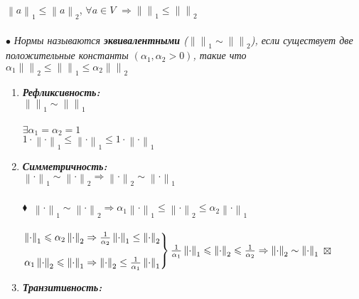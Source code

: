 \documentclass[a4paper, 12pt]{report}
\begin{document}
	\par\bigskip
	$\left \| a \right \|_1 \leqslant \left \| a \right \|_2$, $\forall a \in V$ $\Rightarrow \left \|  \right \|_1 \leqslant \left \|  \right \|_2$\\\\
	$\bullet$ \textit{Нормы называются \textbf{\textit{эквивалентными}} ($\left \|  \right \|_1 \sim \left \|  \right \|_2$), если существует две положительные константы $(\alpha_1, \alpha_2 > 0)$, такие что $\alpha_1 \left \| \right \|_2 \leqslant \left \|  \right \|_1 \leqslant \alpha_2\left \|  \right \|_2$}
	\begin{enumerate}
		\item \textbf{\textit{Рефликсивность:}} \\
		$\left \| \right \|_1 \sim \left \|  \right \|_1$\\\\
		$\exists \alpha_1=\alpha_2=1$\\
		$1\cdot \left \| \cdot \right \|_1 \leqslant \left \| \cdot \right \|_1 \leqslant 1 \cdot \left \| \cdot \right \|_1$
		\item \textbf{\textit{Симметричность:}}  \\
		$\left \| \cdot \right \|_1 \sim \left \| \cdot \right \|_2 \Rightarrow \left \| \cdot \right \|_2 \sim \left \| \cdot \right \|_1 $\\\\
		$\blacklozenge\ $
		$\left \| \cdot \right \|_1 \sim \left \| \cdot \right \|_2 \Rightarrow \alpha_1 \left \| \cdot \right \|_1 \leqslant \left \| \cdot \right \|_2 \leqslant \alpha_2 \left \| \cdot \right \|_1$ \\\\
		$\left.\begin{matrix}
			\left \| \cdot \right \|_1 \leqslant \alpha_2\left \| \cdot \right \|_2 \Rightarrow \frac{1}{\alpha_2}\left \| \cdot \right \|_1\leq\left \| \cdot \right \|_2\\\\
			\alpha_1\left \| \cdot \right \|_2 \leqslant \left \| \cdot \right \|_1 \Rightarrow \left \| \cdot \right \|_2 \leq\frac{1}{\alpha_1}\left \| \cdot \right \|_1
		\end{matrix}\right\}\frac{1}{\alpha_1}\left \| \cdot \right \|_1 \leqslant \left \| \cdot \right \|_2 \leqslant \frac{1}{\alpha_2}\\
		\Rightarrow \left \| \cdot \right \|_2 \sim \left \| \cdot \right \|_1$
		$\boxtimes$
		\item  \textbf{\textit{Транзитивность:}}\\

\end{enumerate}
\end{document}
